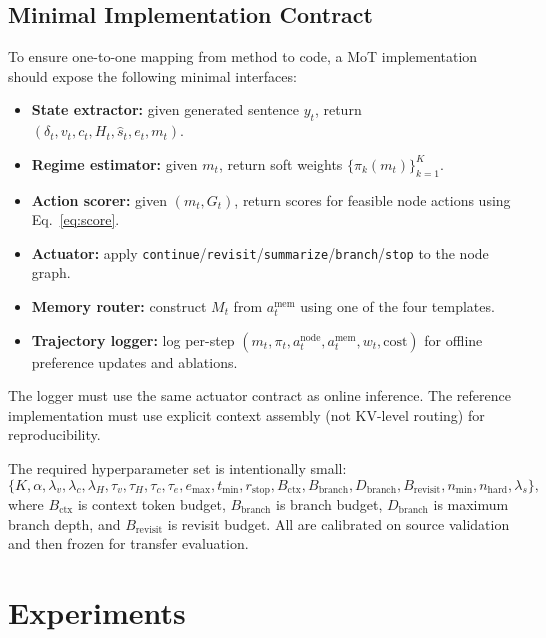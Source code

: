 \documentclass{article}
\begin{document}
\subsection{Minimal Implementation Contract}
\label{sec:contract}
To ensure one-to-one mapping from method to code, a MoT implementation should expose the following minimal interfaces:
\begin{itemize}[leftmargin=1.3em, itemsep=0.2em]
    \item \textbf{State extractor:} given generated sentence $y_t$, return $(\delta_t,v_t,c_t,H_t,\hat s_t,e_t,m_t)$.
    \item \textbf{Regime estimator:} given $m_t$, return soft weights $\{\pi_k(m_t)\}_{k=1}^K$.
    \item \textbf{Action scorer:} given $(m_t,G_t)$, return scores for feasible node actions using Eq.~\eqref{eq:score}.
    \item \textbf{Actuator:} apply \texttt{continue}/\texttt{revisit}/\texttt{summarize}/\texttt{branch}/\texttt{stop} to the node graph.
    \item \textbf{Memory router:} construct $M_t$ from $a_t^{\text{mem}}$ using one of the four templates.
    \item \textbf{Trajectory logger:} log per-step $(m_t,\pi_t,a_t^{\text{node}},a_t^{\text{mem}},w_t,\text{cost})$ for offline preference updates and ablations.
\end{itemize}
The logger must use the same actuator contract as online inference.
The reference implementation must use explicit context assembly (not KV-level routing) for reproducibility.

The required hyperparameter set is intentionally small:
\[
\{K,\alpha,\lambda_v,\lambda_c,\lambda_H,\tau_v,\tau_H,\tau_c,\tau_e,e_{\max},t_{\min},r_{\mathrm{stop}},B_{\mathrm{ctx}},B_{\mathrm{branch}},D_{\mathrm{branch}},B_{\mathrm{revisit}},n_{\min},n_{\mathrm{hard}},\lambda_s\},
\]
where $B_{\mathrm{ctx}}$ is context token budget, $B_{\mathrm{branch}}$ is branch budget, $D_{\mathrm{branch}}$ is maximum branch depth, and $B_{\mathrm{revisit}}$ is revisit budget. All are calibrated on source validation and then frozen for transfer evaluation.

\section{Experiments}
\label{sec:experiments}
\end{document}
